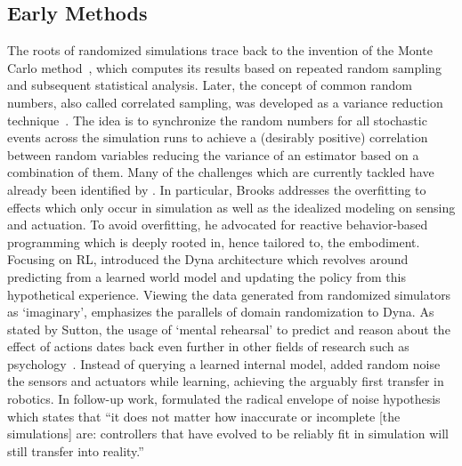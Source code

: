 \documentclass[utf8]{frontiersSCNS} %
\begin{document}
\subsection{Early Methods}
\label{sec_sota_early_methods}
The roots of randomized simulations trace back to the invention of the Monte Carlo method~\citep{Metropolis_Ulam_49}, which computes its results based on repeated random sampling and subsequent statistical analysis.  
%
Later, the concept of common random numbers, also called correlated sampling, was developed as a variance reduction technique~\citep{Kahn_Marshall_53,Wright_Ramsay_79}.
The idea is to synchronize the random numbers for all stochastic events across the simulation runs to achieve a (desirably positive) correlation between random variables reducing the variance of an estimator based on a combination of them.
%
Many of the \simtoreal challenges which are currently tackled have already been identified by \citet{Brooks_92}.
In particular, Brooks addresses the overfitting to effects which only occur in simulation as well as the idealized modeling on sensing and actuation.
To avoid overfitting, he advocated for reactive behavior-based programming which is deeply rooted in, hence tailored to, the embodiment.
%
Focusing on \ac{RL}, \citet{Sutton_91} introduced the Dyna architecture which revolves around predicting from a learned world model and updating the policy from this hypothetical experience.
Viewing the data generated from randomized simulators as \enquote*{imaginary}, emphasizes the parallels of domain randomization to Dyna.
As stated by Sutton, the usage of \enquote*{mental rehearsal} to predict and reason about the effect of actions dates back even further in other fields of research such as psychology~\citep{Craik_43,Dennett_75}.
Instead of querying a learned internal model, \citet{Jakobi_Harvey_95} added random noise the sensors and actuators while learning, achieving the arguably first \simtoreal transfer in robotics.
In follow-up work, \citet{Jakobi_97} formulated the radical envelope of noise hypothesis which states that \enquote{it does not matter how inaccurate or incomplete [the simulations] are: controllers that have evolved to be reliably fit in simulation will still transfer into reality.}
\end{document}
